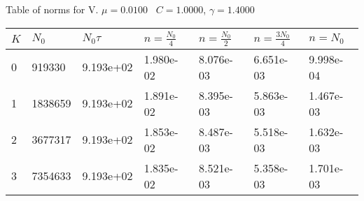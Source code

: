 \begin{center}
Table of norms for V. $\mu = 0.0100$ \, $C = 1.0000$, $\gamma = 1.4000$
  
\begin{tabular}{|p{0.8in}|p{0.8in}|p{0.8in}|p{0.8in}|p{0.8in}|p{0.8in}|p{0.8in}|} \hline
$K$ &$N_0$ &$N_0 \tau$ &$n = \frac{N_0}{4}$ &$n = \frac{N_0}{2}$ &$n = \frac{3N_0}{4}$ &$n = N_0$ \\ \hline 
0 &919330 &9.193e+02 &1.980e-02 &8.076e-03 &6.651e-03 &9.998e-04 \\ \hline 
1 &1838659 &9.193e+02 &1.891e-02 &8.395e-03 &5.863e-03 &1.467e-03 \\ \hline 
2 &3677317 &9.193e+02 &1.853e-02 &8.487e-03 &5.518e-03 &1.632e-03 \\ \hline 
3 &7354633 &9.193e+02 &1.835e-02 &8.521e-03 &5.358e-03 &1.701e-03 \\ \hline 

\end{tabular}\\[20pt]
\end{center}
